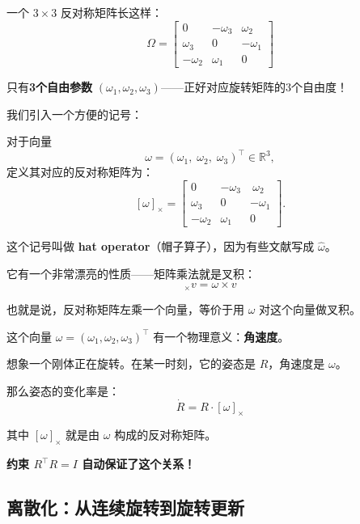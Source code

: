 一个 $3 \times 3$ 反对称矩阵长这样：
\begin{equation}
\Omega = \begin{bmatrix} 0 & -\omega_3 & \omega_2 \\ \omega_3 & 0 & -\omega_1 \\ -\omega_2 & \omega_1 & 0 \end{bmatrix}
\end{equation}

只有\textbf{3个自由参数} $(\omega_1, \omega_2, \omega_3)$——正好对应旋转矩阵的3个自由度！

我们引入一个方便的记号：

\begin{definition}[反对称矩阵与向量的对应]
对于向量 
\[
\omega = 
(\omega_1,\; \omega_2,\; \omega_3)^\top \in \mathbb{R}^3,
\]
定义其对应的反对称矩阵为：
\[
[\omega]_\times 
=
\begin{bmatrix}
0        & -\omega_3 & \ \omega_2 \\
\omega_3 & 0         & -\omega_1  \\
-\omega_2& \omega_1  & 0
\end{bmatrix}.
\]


这个记号叫做 \textbf{hat operator}（帽子算子），因为有些文献写成 $\hat{\omega}$。

它有一个非常漂亮的性质——矩阵乘法就是叉积：
\begin{equation}
[\omega]_\times v = \omega \times v
\end{equation}

也就是说，反对称矩阵左乘一个向量，等价于用 $\omega$ 对这个向量做叉积。
\end{definition}

这个向量 $\omega = (\omega_1, \omega_2, \omega_3)^\top$ 有一个物理意义：\textbf{角速度}。

\begin{physicalmeaning}
想象一个刚体正在旋转。在某一时刻，它的姿态是 $R$，角速度是 $\omega$。

那么姿态的变化率是：
\begin{equation}
\dot{R} = R \cdot [\omega]_\times
\end{equation}

其中 $[\omega]_\times$ 就是由 $\omega$ 构成的反对称矩阵。

\textbf{约束 $R^\top R = I$ 自动保证了这个关系！}
\end{physicalmeaning}

\subsection*{离散化：从连续旋转到旋转更新}

